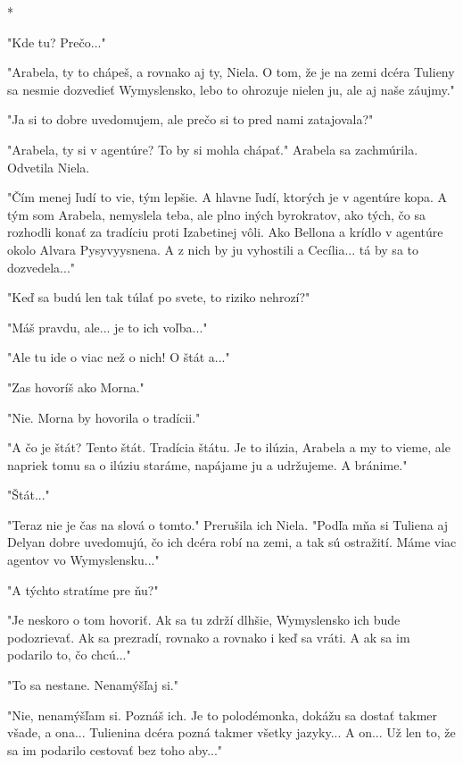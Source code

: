 \documentclass{book}
\begin{document}
\begin{center}

*

\end{center}

"$ $Kde tu? Prečo..."$ $ 

"$ $Arabela, ty to chápeš, a rovnako aj ty, Niela. O tom, že je na zemi dcéra Tulieny sa nesmie dozvedieť Wymyslensko, lebo to ohrozuje nielen ju, ale aj naše záujmy."$ $ 

"$ $Ja si to dobre uvedomujem, ale prečo si to pred nami zatajovala?"$ $ 

"$ $Arabela, ty si v agentúre? To by si mohla chápať."$ $  Arabela sa zachmúrila. Odvetila Niela.

"$ $Čím menej ľudí to vie, tým lepšie. A hlavne ľudí, ktorých je v agentúre kopa. A tým som Arabela, nemyslela teba, ale plno iných byrokratov, ako tých, čo sa rozhodli konať za tradíciu proti Izabetinej vôli. Ako Bellona a krídlo v agentúre okolo Alvara Pysyvyysnena. A z nich by ju vyhostili a Cecília... tá by sa to dozvedela..."$ $ 

"$ $Keď sa budú len tak túlať po svete, to riziko nehrozí?"$ $ 

"$ $Máš pravdu, ale... je to ich voľba..."$ $ 

"$ $Ale tu ide o viac než o nich! O štát a..."$ $ 

"$ $Zas hovoríš ako Morna."$ $ 

"$ $Nie. Morna by hovorila o tradícii."$ $ 

"$ $A čo je štát? Tento štát. Tradícia štátu. Je to ilúzia, Arabela a my to vieme, ale napriek tomu sa o ilúziu staráme, napájame ju a udržujeme. A bránime."$ $ 

"$ $Štát..."$ $ 

"$ $Teraz nie je čas na slová o tomto."$ $  Prerušila ich Niela. "$ $Podľa mňa si Tuliena aj Delyan dobre uvedomujú, čo ich dcéra robí na zemi, a tak sú ostražití. Máme viac agentov vo Wymyslensku..."$ $ 

"$ $A týchto stratíme pre ňu?"$ $ 

"$ $Je neskoro o tom hovoriť. Ak sa tu zdrží dlhšie, Wymyslensko ich bude podozrievať. Ak sa prezradí, rovnako a rovnako i keď sa vráti. A ak sa im podarilo to, čo chcú..."$ $ 

"$ $To sa nestane. Nenamýšľaj si."$ $ 

"$ $Nie, nenamýšľam si. Poznáš ich. Je to polodémonka, dokážu sa dostať takmer všade, a ona... Tulienina dcéra pozná takmer všetky jazyky... A on... Už len to, že sa im podarilo cestovať bez toho aby..."$ $ 
\end{document}
